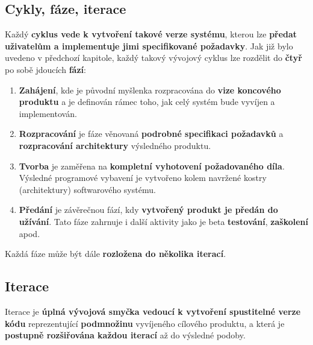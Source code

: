 \subsection{Cykly, fáze, iterace}
Každý \textbf{cyklus vede k vytvoření takové verze systému}, kterou lze \textbf{předat uživatelům a implementuje jimi specifikované požadavky}. Jak již bylo uvedeno v předchozí kapitole, každý takový vývojový cyklus lze rozdělit do \textbf{čtyř} po sobě jdoucích \textbf{fází}:
\begin{enumerate}
    \item \textbf{Zahájení}, kde je původní myšlenka rozpracována do \textbf{vize koncového produktu} a je definován rámec toho, jak celý systém bude vyvíjen a implementován.
    \item \textbf{Rozpracování} je fáze věnovaná \textbf{podrobné specifikaci požadavků} a \textbf{rozpracování architektury} výsledného produktu.
    \item \textbf{Tvorba} je zaměřena na \textbf{kompletní vyhotovení požadovaného díla}.  Výsledné  programové vybavení je vytvořeno kolem navržené kostry (architektury) softwarového systému.
    \item \textbf{Předání} je závěrečnou fází, kdy \textbf{vytvořený produkt je předán do užívání}. Tato fáze zahrnuje i další aktivity jako je beta \textbf{testování}, \textbf{zaškolení} apod.
\end{enumerate}
Každá fáze může být dále \textbf{rozložena do několika iterací}.

\subsection{Iterace}
Iterace je \textbf{úplná vývojová smyčka vedoucí k vytvoření spustitelné verze kódu} reprezentující \textbf{podmnožinu} vyvíjeného cílového produktu, a která je \textbf{postupně rozšiřována každou iterací} až do výsledné podoby.
\\\\
\noindent{}

